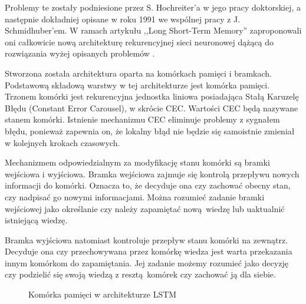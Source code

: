 \documentclass[10pt,a4paper]{article}
\begin{document}
Problemy te zostały podniesione przez S. Hochreiter'a w jego pracy doktorskiej, a następnie dokładniej opisane w roku 1991 we wspólnej pracy z J. Schmidhuber'em. 
W ramach artykułu ,,Long Short-Term Memory'' zaproponowali oni całkowicie nową architekturę rekurencyjnej sieci neuronowej dążącą do rozwiązania wyżej opisanych problemów \cite{hochreiter1997long}.

Stworzona została architektura oparta na komórkach pamięci i bramkach. Podstawową składową warstwy w tej architekturze jest komórka pamięci. Trzonem komórki jest rekurencyjna jednostka liniowa posiadająca Stałą Karuzelę Błędu (Constant Error Carousel), w skrócie CEC. Wartości CEC będą nazywane stanem komórki. Istnienie mechanizmu CEC eliminuje problemy z sygnałem błędu, ponieważ zapewnia on, że lokalny błąd nie będzie się samoistnie zmieniał w kolejnych krokach czasowych.

Mechanizmem odpowiedzialnym za modyfikację stanu komórki są bramki wejściowa i wyjściowa. Bramka wejściowa zajmuje się kontrolą przepływu nowych informacji do komórki. Oznacza to, że decyduje ona czy zachować obecny stan, czy nadpisać go nowymi informacjami. Można rozumieć zadanie bramki wejściowej jako określanie czy należy zapamiętać nową wiedzę lub uaktualnić istniejącą wiedzę. 

Bramka wyjściowa natomiast kontroluje przepływ stanu komórki na zewnątrz. Decyduje ona czy przechowywana przez komórkę wiedza jest warta przekazania innym komórkom do zapamiętania. Jej zadanie możemy rozumieć jako decyzję czy podzielić się swoją wiedzą z resztą komórek czy zachować ją dla siebie. 

\begin{figure}[!ht]
	\centering
	\caption{Komórka pamięci w architekturze LSTM}
\end{figure}
\FloatBarrier
\end{document}
